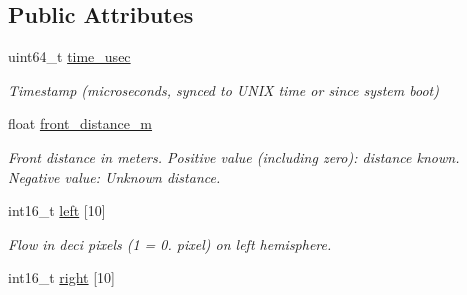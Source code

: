 \subsection*{Public Attributes}
\begin{DoxyCompactItemize}
\item 
\hypertarget{struct____mavlink__omnidirectional__flow__t_aab9c4c4e1b066f5177717903d682da31}{uint64\+\_\+t \hyperlink{struct____mavlink__omnidirectional__flow__t_aab9c4c4e1b066f5177717903d682da31}{time\+\_\+usec}}\label{struct____mavlink__omnidirectional__flow__t_aab9c4c4e1b066f5177717903d682da31}

\begin{DoxyCompactList}\small\item\em Timestamp (microseconds, synced to U\+N\+I\+X time or since system boot) \end{DoxyCompactList}\item 
\hypertarget{struct____mavlink__omnidirectional__flow__t_abe55c09994c092ad6fb028827de0a580}{float \hyperlink{struct____mavlink__omnidirectional__flow__t_abe55c09994c092ad6fb028827de0a580}{front\+\_\+distance\+\_\+m}}\label{struct____mavlink__omnidirectional__flow__t_abe55c09994c092ad6fb028827de0a580}

\begin{DoxyCompactList}\small\item\em Front distance in meters. Positive value (including zero)\+: distance known. Negative value\+: Unknown distance. \end{DoxyCompactList}\item 
\hypertarget{struct____mavlink__omnidirectional__flow__t_a6e8ae28c99c6813aa5131783a4b07434}{int16\+\_\+t \hyperlink{struct____mavlink__omnidirectional__flow__t_a6e8ae28c99c6813aa5131783a4b07434}{left} \mbox{[}10\mbox{]}}\label{struct____mavlink__omnidirectional__flow__t_a6e8ae28c99c6813aa5131783a4b07434}

\begin{DoxyCompactList}\small\item\em Flow in deci pixels (1 = 0. pixel) on left hemisphere. \end{DoxyCompactList}\item 
\hypertarget{struct____mavlink__omnidirectional__flow__t_a01a2eee9edb803f9d1864eca202c6d02}{int16\+\_\+t \hyperlink{struct____mavlink__omnidirectional__flow__t_a01a2eee9edb803f9d1864eca202c6d02}{right} \mbox{[}10\mbox{]}}\label{struct____mavlink__omnidirectional__flow__t_a01a2eee9edb803f9d1864eca202c6d02}


\end{DoxyCompactItemize}

